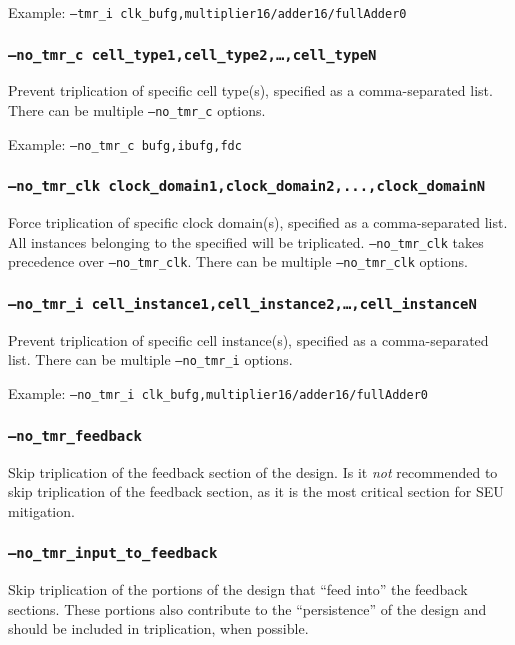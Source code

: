 \documentclass[english]{article}
\begin{document}
Example: \texttt{--tmr\_i clk\_bufg,multiplier16/adder16/fullAdder0}

\subsubsection{\texttt{--no\_tmr\_c cell\_type1,cell\_type2,\ldots,cell\_typeN}}
Prevent triplication of specific cell type(s), specified as a comma-separated 
list. There can be multiple \texttt{--no\_tmr\_c} options.

Example: \texttt{--no\_tmr\_c bufg,ibufg,fdc}

\subsubsection{\texttt{--no\_tmr\_clk clock\_domain1,clock\_domain2,...,clock\_domainN}}
Force triplication of specific clock domain(s), specified as a comma-separated
list. All instances belonging to the specified will be triplicated.
\texttt{--no\_tmr\_clk} takes precedence over \texttt{--no\_tmr\_clk}. There can
be multiple \texttt{--no\_tmr\_clk} options.

\subsubsection{\texttt{--no\_tmr\_i cell\_instance1,cell\_instance2,\ldots,cell\_instanceN}}
Prevent triplication of specific cell instance(s), specified as a 
comma-separated list. There can be multiple \texttt{--no\_tmr\_i} options.

Example: \texttt{--no\_tmr\_i clk\_bufg,multiplier16/adder16/fullAdder0}

\subsubsection{\texttt{--no\_tmr\_feedback}}
Skip triplication of the feedback section of the design. 
Is it \emph{not} recommended to skip triplication of the feedback section, as 
it is the most critical section for SEU mitigation.

\subsubsection{\texttt{--no\_tmr\_input\_to\_feedback}}
Skip triplication of the portions of the design that ``feed into'' the feedback 
sections. These portions also contribute to the ``persistence'' of the design 
and should be included in triplication, when possible.
\end{document}
